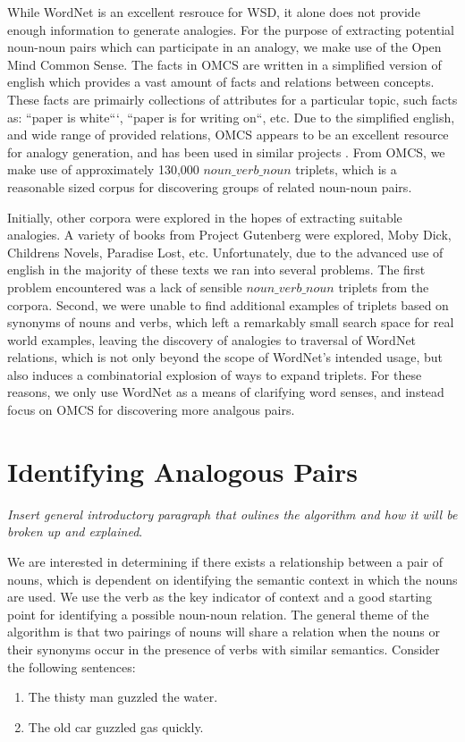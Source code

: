 \documentclass[11pt]{article}
\begin{document}
While WordNet is an excellent resrouce for WSD, it alone does not provide enough
information to generate analogies.  For the purpose of extracting potential
noun-noun pairs which can participate in an analogy, we make use of the Open
Mind Common Sense.  The facts in OMCS are written in a simplified version of
english which provides a vast amount of facts and relations between concepts.
These facts are primairly collections of attributes for a particular topic, such
facts as: ``paper is white```, ``paper is for writing on``, etc.  Due to the
simplified english, and wide range of provided relations, OMCS appears to be an
excellent resource for analogy generation, and has been used in similar projects
\cite{speer08analogyspace}.  From OMCS, we make use of approximately 130,000
$noun\_verb\_noun$ triplets, which is a reasonable sized corpus for discovering
groups of related noun-noun pairs.


Initially, other corpora were explored in the hopes of extracting suitable
analogies.  A variety of books from Project Gutenberg were explored, Moby Dick,
Childrens Novels, Paradise Lost, etc.  Unfortunately, due to the advanced use of
english in the majority of these texts we ran into several problems.  The first
problem encountered was a lack of sensible $noun\_verb\_noun$ triplets from the
corpora.  Second, we were unable to find additional examples of triplets based
on synonyms of nouns and verbs, which left a remarkably small search space for
real world examples, leaving the discovery of analogies to traversal of WordNet
relations, which is not only beyond the scope of WordNet's intended usage, but
also induces a combinatorial explosion of ways to expand triplets.  For these
reasons, we only use WordNet as a means of clarifying word senses, and instead
focus on OMCS for discovering more analgous pairs.

\section{Identifying Analogous Pairs}
\label{sec:identifying}

\emph{Insert general introductory paragraph that oulines the algorithm and how
  it will be broken up and explained}.

We are interested in determining if there exists a relationship between a pair
of nouns, which is dependent on identifying the semantic context in which the
nouns are used.  We use the verb as the key indicator of context and a good
starting point for identifying a possible noun-noun relation.  The general theme
of the algorithm is that two pairings of nouns will share a relation when the
nouns or their synonyms occur in the presence of verbs with similar semantics.
Consider the following sentences:
\begin{enumerate}
  \item The thisty man guzzled the water.
  \item The old car guzzled gas quickly.
\end{enumerate}
\end{document}
